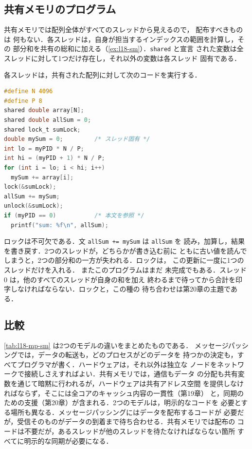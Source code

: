\documentclass[../main.tex]{subfiles}
\begin{document}
\subsection{共有メモリのプログラム}

共有メモリでは配列全体がすべてのスレッドから見えるので，%
配布すべきものは
何もない．各スレッドは，自身が担当するインデックスの範囲を計算し，その
部分和を共有の総和に加える（\cref{ex:l18-sm}）．\texttt{shared} と宣言
された変数は全スレッドに対して1つだけ存在し，それ以外の変数は各スレッド
固有である．

\begin{example}[共有メモリ]
  \label{ex:l18-sm}
  各スレッドは，共有された配列に対して次のコードを実行する．
  \begin{lstlisting}[language=C, numbers=none, morekeywords={shared}]
#define N 4096
#define P 8
shared double array[N];
shared double allSum = 0;
shared lock_t sumLock;
double mySum = 0;         /* スレッド固有 */
int lo = myPID * N / P;
int hi = (myPID + 1) * N / P;
for (int i = lo; i < hi; i++)
  mySum += array[i];
lock(&sumLock);
allSum += mySum;
unlock(&sumLock);
if (myPID == 0)           /* 本文を参照 */
  printf("sum: %f\n", allSum);
\end{lstlisting}
\end{example}

ロックは不可欠である．文 \texttt{allSum += mySum} は \texttt{allSum} を
読み，加算し，結果を書き戻す．2つのスレッドが，どちらかが書き込む前に
ともに古い値を読んでしまうと，2つの部分和の一方が失われる．ロックは，
この更新に一度に1つのスレッドだけを入れる．%
またこのプログラムはまだ
未完成でもある．スレッド 0 は，他のすべてのスレッドが自身の和を加え
終わるまで待ってから合計を印字しなければならない．ロックと，この種の
待ち合わせは第20章の主題である．

\subsection{比較}

\cref{tab:l18-mp-sm} は2つのモデルの違いをまとめたものである．
メッセージパッシングでは，データの転送も，どのプロセスがどのデータを
持つかの決定も，すべてプログラマが書く．ハードウェアは，それ以外は独立な
ノードをネットワークで接続しさえすればよい．共有メモリでは，通信もデータ
の分配も共有変数を通じて暗黙に行われるが，ハードウェアは共有アドレス空間
を提供しなければならず，そこには全コアのキャッシュ内容の一貫性（第19章）
と，同期のための支援（第20章）が含まれる．2つのモデルは，明示的なコードを
必要とする場所も異なる．メッセージパッシングにはデータを配布するコードが
必要だが，受信そのものがデータの到着まで待ち合わせる．共有メモリでは配布の
コードは不要だが，あるスレッドが他のスレッドを待たなければならない箇所
すべてに明示的な同期が必要になる．
\end{document}
